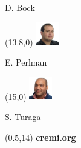 \documentclass[aspectratio=169,table]{beamer}
\begin{document}
\begin{frame}
\begin{textblock}{3}
        D. Bock%
    \end{textblock}%
    
    \begin{textblock}{3}(13.8,0)
        \tiny\includegraphics[width=1cm]{fig/people/perlman.jpeg}
        
        E. Perlman%
    \end{textblock}%
    
    \begin{textblock}{3}(15,0)
        \tiny\includegraphics[width=1cm]{fig/people/turaga.jpg}
        
        S. Turaga%
    \end{textblock}%
    
    \begin{textblock}{3}(0.5,14)
        {\color{white}\Huge\bf cremi.org}
    \end{textblock}
\end{frame}
\end{document}
